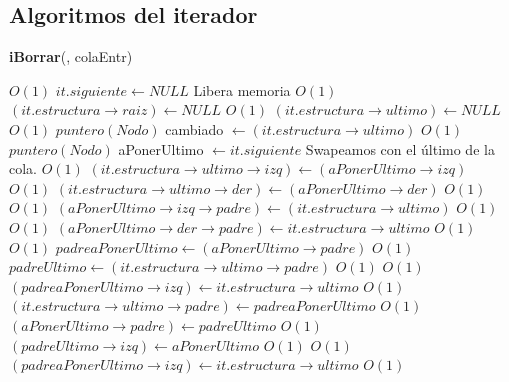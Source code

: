 \begin{Algoritmos}
\subsection{Algoritmos del iterador}

{\textbf{iBorrar}(, colaEntr)}
    	\begin{algorithmic}[1]
    		 \Comment $O(1)$
    			\State $it.siguiente \gets NULL$ \Comment Libera memoria $O(1)$
    			\State $(it.estructura \rightarrow raiz) \gets NULL$ \Comment $O(1)$
    			\State $(it.estructura \rightarrow ultimo) \gets NULL$ \Comment $O(1)$
    		\Else    		
    			\State $puntero(Nodo)$ cambiado $\gets (it.estructura \rightarrow ultimo)$ \Comment $O(1)$
    			\State $puntero(Nodo)$ aPonerUltimo $\gets it.siguiente$
				 \Comment Swapeamos con el \'ultimo de la cola. $O(1)$	
					\State $(it.estructura \rightarrow ultimo \rightarrow izq) \gets (aPonerUltimo \rightarrow izq)$ \Comment $O(1)$
			\State $(it.estructura \rightarrow ultimo \rightarrow der) \gets (aPonerUltimo \rightarrow der)$ \Comment $O(1)$	
			 \Comment $O(1)$
				\State $(aPonerUltimo \rightarrow izq \rightarrow padre) \gets (it.estructura \rightarrow ultimo)$ \Comment $O(1)$
			\EndIf	
			 \Comment $O(1)$
				\State $(aPonerUltimo \rightarrow der \rightarrow padre) \gets it.estructura \rightarrow ultimo$ \Comment $O(1)$
			\EndIf		
			 \Comment $O(1)$
				\State $padreaPonerUltimo \gets (aPonerUltimo \rightarrow padre)$ \Comment $O(1)$
				\State $padreUltimo \gets (it.estructura \rightarrow ultimo \rightarrow padre)$			 	 \Comment $O(1)$
			 	 \Comment $O(1)$
			 	\State $(padreaPonerUltimo \rightarrow izq) \gets it.estructura \rightarrow ultimo$ \Comment $O(1)$
			 	\State $(it.estructura \rightarrow ultimo \rightarrow padre) \gets padreaPonerUltimo$ \Comment $O(1)$
			 	\State $(aPonerUltimo \rightarrow padre) \gets padreUltimo$ \Comment $O(1)$
			 	\State $(padreUltimo \rightarrow izq) \gets aPonerUltimo$ \Comment $O(1)$
			 	\Else
			 		 \Comment $O(1)$
			 		\State $(padreaPonerUltimo \rightarrow izq) \gets it.estructura \rightarrow ultimo$ \Comment $O(1)$

\end{algorithmic}
\end{Algoritmos}
